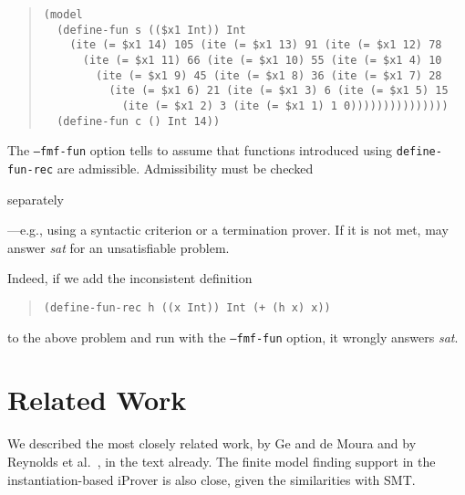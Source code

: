 %
\begin{quote}
\begin{verbatim}
(model
  (define-fun s (($x1 Int)) Int 
    (ite (= $x1 14) 105 (ite (= $x1 13) 91 (ite (= $x1 12) 78 
      (ite (= $x1 11) 66 (ite (= $x1 10) 55 (ite (= $x1 4) 10 
        (ite (= $x1 9) 45 (ite (= $x1 8) 36 (ite (= $x1 7) 28 
          (ite (= $x1 6) 21 (ite (= $x1 3) 6 (ite (= $x1 5) 15 
            (ite (= $x1 2) 3 (ite (= $x1 1) 1 0)))))))))))))))
  (define-fun c () Int 14))
\end{verbatim}
\end{quote}

The \texttt{--fmf-fun} option tells \cvc to assume that
functions introduced using \texttt{define-\allowbreak fun-\allowbreak rec} are admissible.
Admissibility must be checked \begin{longv}separately \end{longv}---e.g., using a
syntactic criterion or a termination prover.
If it is not met, \cvc may answer \emph{sat} for
an unsatisfiable problem. 
\begin{longv}
Indeed, if we add the inconsistent definition
%
\begin{quote}
\begin{verbatim}
(define-fun-rec h ((x Int)) Int (+ (h x) x))
\end{verbatim}
\end{quote}
%
to the above problem and run \cvc with the \texttt{--fmf-fun} option,
it wrongly answers \emph{sat}.
\end{longv}


\section{Related Work}

We described the most closely related work, by Ge and de Moura
\cite{GeDeM-CAV-09} and by Reynolds et al.\
\cite{ReyEtAl-1-RR-13,reynolds-et-al-2013}, in the text already.
The finite model finding support in the instantiation-based iProver
\cite{korovin-2013} is also close, given the similarities with SMT.

